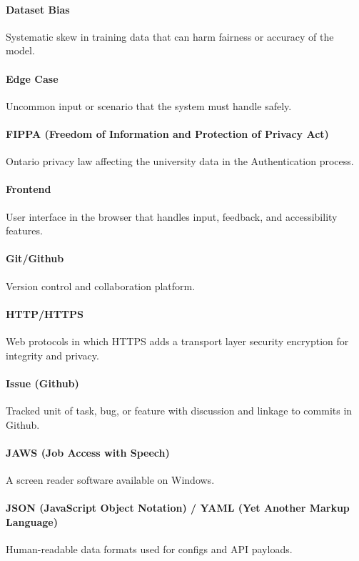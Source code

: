 \documentclass[12pt]{article}
\begin{document}
\paragraph*{Dataset Bias}
Systematic skew in training data that can harm fairness or accuracy of the model.

\paragraph*{Edge Case}
Uncommon input or scenario that the system must handle safely.

\paragraph*{FIPPA (Freedom of Information and Protection of Privacy Act)}
Ontario privacy law affecting the university data in the Authentication process.

\paragraph*{Frontend}
User interface in the browser that handles input, feedback, and accessibility features.

\paragraph*{Git/Github}
Version control and collaboration platform. 

\paragraph*{HTTP/HTTPS}
Web protocols in which HTTPS adds a transport layer security encryption for integrity and privacy.

\paragraph*{Issue (Github)}
Tracked unit of task, bug, or feature with discussion and linkage to commits in Github.

\paragraph*{JAWS (Job Access with Speech)}
A screen reader software available on Windows.

\paragraph*{JSON (JavaScript Object Notation) / YAML (Yet Another Markup Language)}
Human-readable data formats used for configs and API payloads.
\end{document}
